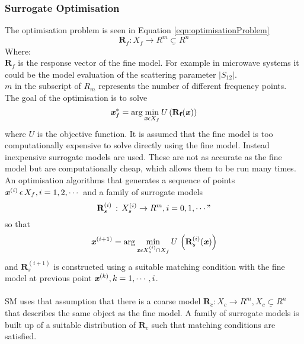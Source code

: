 \subsubsection*{Surrogate Optimisation}
The optimisation problem is seen in Equation \ref{eqn:optimisationProblem}
\begin{equation}
\textbf{R}_f : X_f \rightarrow R^m \underline{\subset} R^n
\label{eqn:optimisationProblem}
\end{equation}
Where: \\
$\textbf{R}_f$ is the response vector of the fine model. For example in microwave systems it could be the model evaluation of the scattering parameter $|S_{12}|$. \\
$m$ in the subscript of $R_m$ represents the number of different frequency points. \\
The goal of the optimisation is to solve 
\begin{equation}
\textbf{\textit{x}}^{*}_f = \mathrm{arg} \, \underset{\textbf{\textit{x}} \epsilon X_{f}}{\mathrm{min}} \, U \, ( \textbf{R}_{\textbf{f}} (\textbf{\textit{x}}) ) 
\label{eqn:optimisationGoal}
\end{equation}
where $U$ is the objective function. It is assumed that the fine model is too computationally expensive to solve directly using the fine model. Instead inexpensive surrogate models are used. These are not as accurate as the fine model but are computationally cheap, which allows them to be run many times. An optimisation algorithms that generates a sequence of points $\textbf{\textit{x}}^{(i)} \, \epsilon \, X_f, i = 1,2,\cdots $ and a family of surrogate models 
\begin{equation}
\textbf{R}_s^{(i)} \, : \, X_s^{(i)} \rightarrow R^m, i=0,1,\cdots" 
\end{equation}
so that 
\begin{equation}
\textbf{\textit{x}}^{(i+1)} = \mathrm{arg} \, \underset{\textbf{\textit{x}} \epsilon X_s^{(i)} \cap X_f}{\mathrm{min}} \, U \, \left(\textbf{R}^{(i)}_s (\textbf{\textit{x}})\right)
\end{equation}
and $\textbf{R}_s^{(i+1)}$ is constructed using a suitable matching condition with the fine model at previous point $\textbf{\textit{x}}^{(k)}, k=1,\cdots,i$. 
\\ \\
SM uses that assumption that there is a coarse model $\textbf{R}_c : X_c \rightarrow R^m, X_c \underline{\subset} R^n$ that describes the same object as the fine model. A family of surrogate models is built up of a suitable distribution of $\textbf{R}_c$ such that matching conditions are satisfied. 

